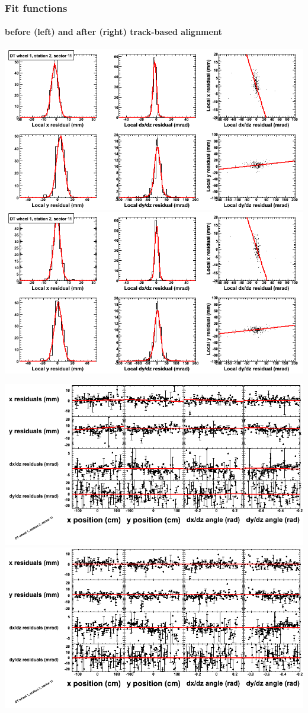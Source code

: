 \documentclass[compress]{beamer}
\begin{document}
\begin{frame}
\frametitle{Fit functions}
\framesubtitle{before (left) and after (right) track-based alignment}
\includegraphics[width=0.5\linewidth]{fitfunctions_re01/MBwhDst2sec11_bellcurves.png} \includegraphics[width=0.5\linewidth]{fitfunctions_re05/MBwhDst2sec11_bellcurves.png}

\includegraphics[width=0.5\linewidth]{fitfunctions_re01/MBwhDst2sec11_polynomials.png} \includegraphics[width=0.5\linewidth]{fitfunctions_re05/MBwhDst2sec11_polynomials.png}
\end{frame}
\end{document}
